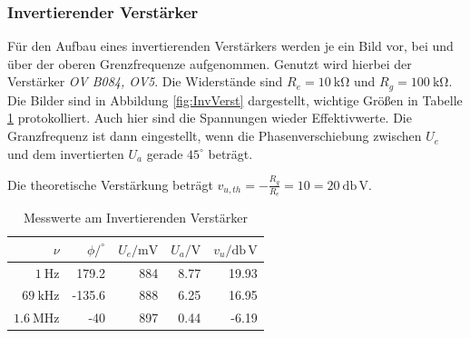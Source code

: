 \documentclass[10pt,a4paper]{scrartcl}
\begin{document}
\subsubsection {Invertierender Verstärker}

Für den Aufbau eines invertierenden Verstärkers werden je ein Bild
vor, bei und über der oberen Grenzfrequenze aufgenommen.
Genutzt wird hierbei der Verstärker \emph{OV B084, OV5}.
Die Widerstände sind $R_e=10~\mathrm{k\Omega}$ und $R_g=100~\mathrm{k\Omega}$.
Die Bilder sind in Abbildung \ref{fig:InvVerst} dargestellt,
wichtige Größen in Tabelle \ref{tab:InvVerst} protokolliert.
Auch hier sind die Spannungen wieder Effektivwerte.
Die Granzfrequenz ist dann eingestellt,
wenn die Phasenverschiebung zwischen $U_e$ und dem invertierten $U_a$ gerade
$45^\circ$ beträgt.

Die theoretische Verstärkung beträgt
$v_{u,th}=-\frac{R_g}{R_e}=10=20~\mathrm{db\,V}$.

\begin{table}[!ht]
    \centering
    \caption{Messwerte am Invertierenden Verstärker}
    \label{tab:InvVerst}
    \begin{tabular}{r|r|r|r|r}
        $\nu$&$\phi/^\circ$&$U_e/\mathrm {mV}$&$U_a/\mathrm V$
        &$v_u/\mathrm{db\,V}$\\
        \hline
        $1~\mathrm{Hz}$&179.2&884&8.77&19.93\\
        $69~\mathrm{kHz}$&-135.6&888&6.25&16.95\\
        $1.6~\mathrm{MHz}$&-40&897&0.44&-6.19
    \end{tabular}
\end{table}
\end{document}
